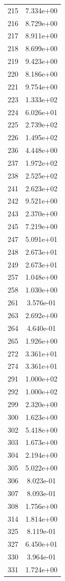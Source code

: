\documentclass[12pt]{article}
\begin{document}
\begin{longtable}{@{}cc@{}}
215 & 7.334e+00 \\
216 & 8.729e+00 \\
217 & 8.911e+00 \\
218 & 8.699e+00 \\
219 & 9.423e+00 \\
220 & 8.186e+00 \\
221 & 9.754e+00 \\
223 & 1.333e+02 \\
224 & 6.026e+01 \\
225 & 2.739e+02 \\
226 & 1.495e+02 \\
236 & 4.448e+00 \\
237 & 1.972e+02 \\
238 & 2.525e+02 \\
241 & 2.623e+02 \\
242 & 9.521e+00 \\
243 & 2.370e+00 \\
245 & 7.219e+00 \\
247 & 5.091e+01 \\
248 & 2.673e+01 \\
249 & 2.673e+01 \\
257 & 1.048e+00 \\
258 & 1.030e+00 \\
261 & 3.576e-01 \\
263 & 2.692e+00 \\
264 & 4.640e-01 \\
265 & 1.926e+00 \\
272 & 3.361e+01 \\
274 & 3.361e+01 \\
291 & 1.000e+02 \\
292 & 1.000e+02 \\
299 & 2.320e+00 \\
300 & 1.623e+00 \\
302 & 5.418e+00 \\
303 & 1.673e+00 \\
304 & 2.194e+00 \\
305 & 5.022e+00 \\
306 & 8.023e-01 \\
307 & 8.093e-01 \\
308 & 1.756e+00 \\
314 & 1.814e+00 \\
325 & 8.119e-01 \\
327 & 6.450e+01 \\
330 & 3.964e-01 \\
331 & 1.724e+00 \\

\end{longtable}
\end{document}
